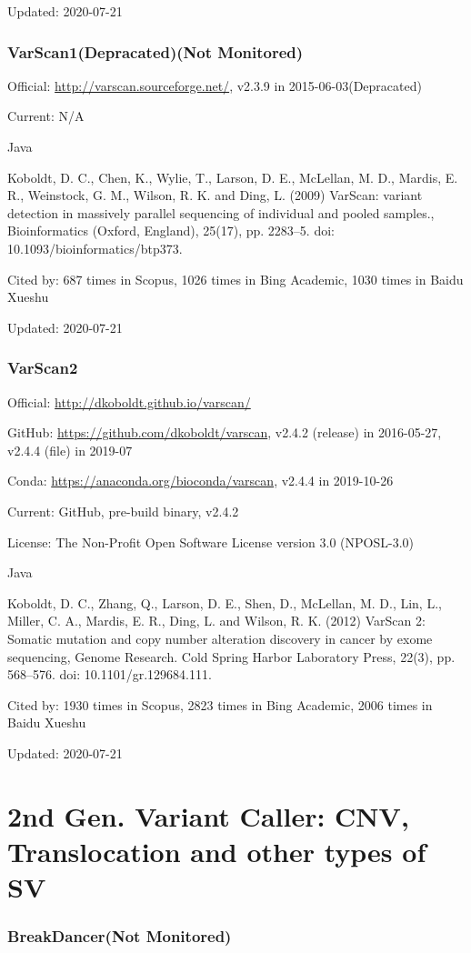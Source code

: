 \documentclass[]{article}
\newcommand{\nm}{{\color{red}(Not Monitored)}}
\newcommand{\de}{{\color{red}(Depracated)}}
\newcommand{\cb}[3]{\par Cited by: {\color{blue}\Huge #1} times in Scopus, {\color{blue}\Huge #2} times in Bing Academic, {\color{blue}\Huge #3} times in Baidu Xueshu}
\begin{document}
Updated: 2020-07-21
\section{VarScan1\de\nm}

Official: \url{http://varscan.sourceforge.net/}, v2.3.9 in 2015-06-03\de

Current: N/A

Java

Koboldt, D. C., Chen, K., Wylie, T., Larson, D. E., McLellan, M. D., Mardis, E. R., Weinstock, G. M., Wilson, R. K. and Ding, L. (2009) VarScan: variant detection in massively parallel sequencing of individual and pooled samples., Bioinformatics (Oxford, England), 25(17), pp. 2283–5. doi: 10.1093/bioinformatics/btp373.\cb{687}{1026}{1030}

Updated: 2020-07-21

\section{VarScan2}

Official: \url{http://dkoboldt.github.io/varscan/}

GitHub: \url{https://github.com/dkoboldt/varscan}, v2.4.2 (release) in 2016-05-27, v2.4.4 (file) in 2019-07

Conda: \url{https://anaconda.org/bioconda/varscan}, v2.4.4 in 2019-10-26

Current: GitHub, pre-build binary, v2.4.2

License: The Non-Profit Open Software License version 3.0 (NPOSL-3.0)

Java

Koboldt, D. C., Zhang, Q., Larson, D. E., Shen, D., McLellan, M. D., Lin, L., Miller, C. A., Mardis, E. R., Ding, L. and Wilson, R. K. (2012) VarScan 2: Somatic mutation and copy number alteration discovery in cancer by exome sequencing, Genome Research. Cold Spring Harbor Laboratory Press, 22(3), pp. 568–576. doi: 10.1101/gr.129684.111.\cb{1930}{2823}{2006}

Updated: 2020-07-21

\part{2nd Gen. Variant Caller: CNV, Translocation and other types of SV}
\section{BreakDancer\nm}
\end{document}
